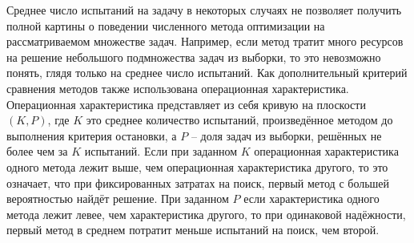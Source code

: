 Среднее число испытаний на задачу в некоторых случаях не позволяет получить полной картины о
поведении численного метода оптимизации на рассматриваемом множестве задач. Например, если метод
тратит много ресурсов на решение небольшого подмножества задач из выборки, то это невозможно понять,
глядя только на среднее число испытаний. Как дополнительный критерий сравнения методов также использована
операционная характеристика. Операционная характеристика
представляет из себя кривую на плоскости \((K, P)\), где \(K\) это среднее количество испытаний,
произведённое методом до выполнения критерия остановки, а \(P\) -- доля задач из выборки, решённых не более чем за \(K\)
испытаний. Если при заданном \(K\) операционная характеристика одного метода лежит выше, чем
операционная характеристика другого, то это означает, что при фиксированных затратах на поиск,
первый метод с большей вероятностью найдёт решение. При заданном \(P\) если характеристика одного метода лежит левее,
чем характеристика другого, то при одинаковой надёжности, первый метод в среднем потратит меньше испытаний на поиск, чем второй.
